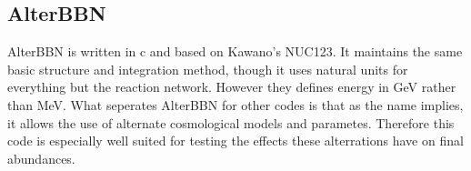 \subsection{AlterBBN}
\label{sec:AlterBBN}

AlterBBN is written in c and based on Kawano's NUC123. It maintains the same basic structure and integration method, though it uses natural units for everything but the reaction network. However they defines energy in GeV rather than MeV. What seperates AlterBBN for other codes is that as the name implies, it allows the use of alternate cosmological models and parametes. Therefore this code is especially well suited for testing the effects these alterrations have on final abundances.